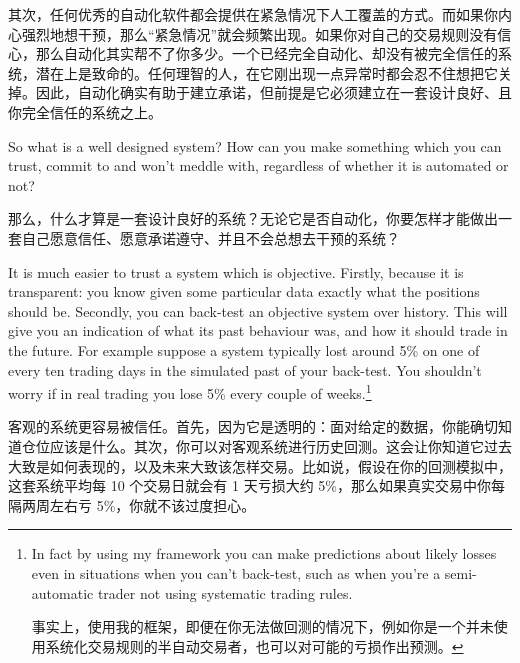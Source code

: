 \begin{chineseblock}其次，任何优秀的自动化软件都会提供在紧急情况下人工覆盖的方式。而如果你内心强烈地想干预，那么“紧急情况”就会频繁出现。如果你对自己的交易规则没有信心，那么自动化其实帮不了你多少。一个已经完全自动化、却没有被完全信任的系统，潜在上是致命的。任何理智的人，在它刚出现一点异常时都会忍不住想把它关掉。因此，自动化确实有助于建立承诺，但前提是它必须建立在一套设计良好、且你完全信任的系统之上。\end{chineseblock}


\begin{englishblock} So what is a well designed system? How can you make something which you can trust, commit to and won't meddle with, regardless of whether it is automated or not? \end{englishblock}

\begin{chineseblock}那么，什么才算是一套设计良好的系统？无论它是否自动化，你要怎样才能做出一套自己愿意信任、愿意承诺遵守、并且不会总想去干预的系统？\end{chineseblock}

\bipairgap

\begin{englishblock} It is much easier to trust a system which is objective. Firstly, because it is transparent: you know given some particular data exactly what the positions should be. Secondly, you can back-test an objective system over history. This will give you an indication of what its past behaviour was, and how it should trade in the future. For example suppose a system typically lost around 5\% on one of every ten trading days in the simulated past of your back-test. You shouldn't worry if in real trading you lose 5\% every couple of weeks.\footnote{In fact by using my framework you can make predictions about likely losses even in situations when you can't back-test, such as when you're a semi-automatic trader not using systematic trading rules. \par 事实上，使用我的框架，即便在你无法做回测的情况下，例如你是一个并未使用系统化交易规则的半自动交易者，也可以对可能的亏损作出预测。}\end{englishblock}

\begin{chineseblock}客观的系统更容易被信任。首先，因为它是透明的：面对给定的数据，你能确切知道仓位应该是什么。其次，你可以对客观系统进行历史回测。这会让你知道它过去大致是如何表现的，以及未来大致该怎样交易。比如说，假设在你的回测模拟中，这套系统平均每 10 个交易日就会有 1 天亏损大约 5\%，那么如果真实交易中你每隔两周左右亏 5\%，你就不该过度担心。\end{chineseblock}

